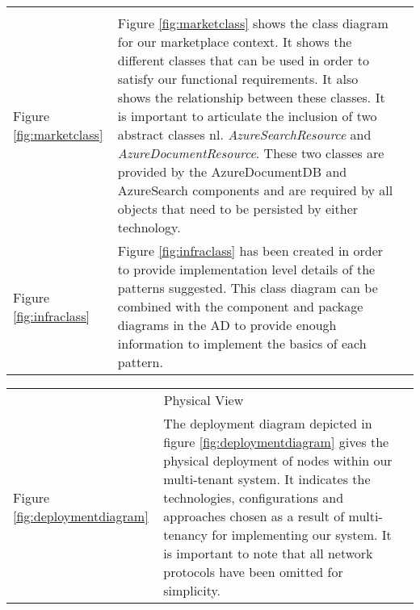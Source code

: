\begin{table}[htp]
\centering
\begin{tabularx}{\textwidth}{lXl}
\cline{1-2}
\multicolumn{2}{|c|}{\cellcolor[HTML]{EFEFEF}{\color[HTML]{000000} Logical View}} &  \\ \cline{1-2}
\multicolumn{1}{|l|}{Figure \ref{fig:marketclass}} & \multicolumn{1}{X|}{Figure \ref{fig:marketclass} shows the class diagram for our marketplace context. It shows the different classes that can be used in order to satisfy our functional requirements. It also shows the relationship between these classes. It is important to articulate the inclusion of two abstract classes nl. \textit{AzureSearchResource} and \textit{AzureDocumentResource}. These two classes are provided by the AzureDocumentDB and AzureSearch components and are required by all objects that need to be persisted by either technology.} &  \\ \cline{1-2}
\multicolumn{1}{|l|}{Figure \ref{fig:infraclass}} & \multicolumn{1}{X|}{Figure \ref{fig:infraclass} has been created in order to provide implementation level details of the patterns suggested. This class diagram can be combined with the component and package diagrams in the AD to provide enough information to implement the basics of each pattern.} &  \\ \cline{1-2}
\cline{1-2}
\end{tabularx}
\label{tab:logicalview}
\end{table}

\begin{table}[htp]
\centering
\begin{tabularx}{\textwidth}{lXl}
\cline{1-2}
\multicolumn{2}{|c|}{\cellcolor[HTML]{EFEFEF}Physical View} &  \\ \cline{1-2}
\multicolumn{1}{|l|}{Figure \ref{fig:deploymentdiagram}} & \multicolumn{1}{X|}{The deployment diagram depicted in figure \ref{fig:deploymentdiagram} gives the physical deployment of nodes within our multi-tenant system. It indicates the technologies, configurations and approaches chosen as a result of multi-tenancy for implementing our system. It is important to note that all network protocols have been omitted for simplicity.} &  \\ \cline{1-2}
\cline{1-2}
\end{tabularx}
\label{tab:physicalview}
\end{table}


